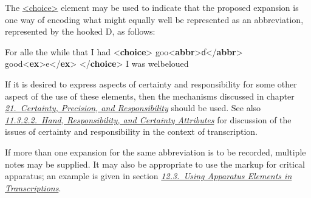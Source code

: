 The \hyperref[TEI.choice]{<choice>} element may be used to indicate that the proposed expansion is one way of encoding what might equally well be represented as an abbreviation, represented by the hooked D, as follows: \par\bgroup{}\exampleFont \begin{shaded}\noindent\mbox{}For alle the while that I had\mbox{}\newline 
{<\textbf{choice}>}\mbox{}\newline 
{}goo{<\textbf{abbr}>}ɗ{</\textbf{abbr}>}\mbox{}\newline 
{}\mbox{}\newline 
{}good{<\textbf{ex}>}e{</\textbf{ex}>}\mbox{}\newline 
{}\mbox{}\newline 
{</\textbf{choice}>} I was\mbox{}\newline 
 welbeloued\end{shaded}\egroup\par \noindent  If it is desired to express aspects of certainty and responsibility for some other aspect of the use of these elements, then the mechanisms discussed in chapter \textit{\hyperref[CE]{21.\ Certainty, Precision, and Responsibility}} should be used. See also \textit{\hyperref[PHHR]{11.3.2.2.\ Hand, Responsibility, and Certainty Attributes}} for discussion of the issues of certainty and responsibility in the context of transcription.\par
If more than one expansion for the same abbreviation is to be recorded, multiple notes may be supplied. It may also be appropriate to use the markup for critical apparatus; an example is given in section \textit{\hyperref[TCTR]{12.3.\ Using Apparatus Elements in Transcriptions}}.
